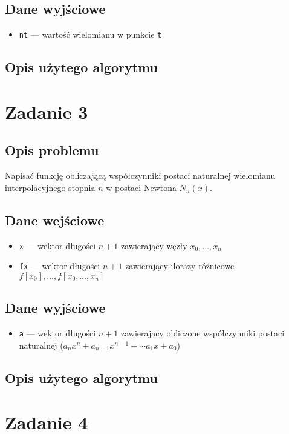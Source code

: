 \documentclass{article}
\begin{document}
\subsection*{Dane wyjściowe}
	\begin{itemize}
	    \item \texttt{nt} — wartość wielomianu w punkcie \texttt{t}
	\end{itemize}
\subsection*{Opis użytego algorytmu}

\section*{Zadanie 3}
\subsection*{Opis problemu}
	Napisać funkcję obliczającą współczynniki postaci naturalnej wielomianu interpolacyjnego stopnia $n$ w postaci Newtona $N_n(x)$.
\subsection*{Dane wejściowe}
	\begin{itemize}
	    \item \texttt{x} — wektor długości $n+1$ zawierający węzły $x_0,\dots,x_n$
	    \item \texttt{fx} — wektor długości $n+1$ zawierający ilorazy różnicowe $f[x_0], \dots, f[x_0,\dots,x_n]$
	\end{itemize}
\subsection*{Dane wyjściowe}
	\begin{itemize}
	    \item \texttt{a} — wektor długości $n+1$ zawierający obliczone współczynniki postaci naturalnej ($a_n x^n + a_{n-1} x^{n-1} + \cdots a_1 x + a_0$)
	\end{itemize}
\subsection*{Opis użytego algorytmu}

\section*{Zadanie 4}
\end{document}
